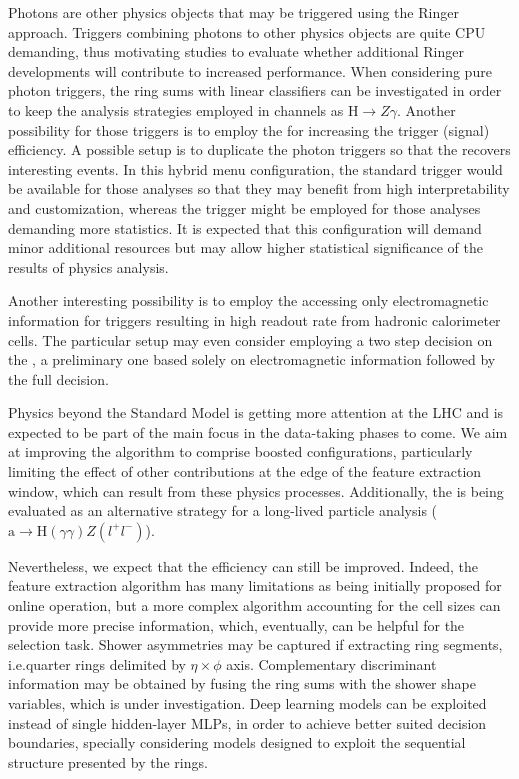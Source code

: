 Photons are other physics objects that may be triggered using the Ringer approach. Triggers combining photons to other physics objects are quite CPU demanding, thus motivating studies to evaluate whether additional Ringer developments will contribute to increased performance.
When considering pure photon triggers, the ring sums with linear classifiers can be investigated in order to keep the analysis strategies employed in channels as $\text{H}\rightarrow Z\gamma$. Another possibility for those triggers is to
employ the \rnn{} for increasing the trigger (signal) efficiency. A possible
setup is to duplicate the photon triggers so that the \rnn{} recovers
interesting events.  In this hybrid menu configuration, the standard trigger
would be available for those analyses so that they may benefit from high
interpretability and customization, whereas the \rnn{} trigger might be employed
for those analyses demanding more statistics. It is expected that this
configuration will demand minor additional resources but may allow higher
statistical significance of the results of physics analysis.


Another interesting possibility is to employ the \rnn{} accessing only
electromagnetic information for triggers resulting in high readout rate from
hadronic calorimeter cells. The particular setup may even consider employing a
two step decision on the \fastcalo{}, a preliminary one based solely on
electromagnetic information followed by the full \rnn{} decision.




Physics beyond the Standard Model is getting more attention at the LHC and is expected to be part of the main focus in the data-taking phases to
come. We aim at improving the \rnn{} algorithm to comprise boosted
configurations, particularly limiting the effect of other contributions at
the edge of the feature extraction window, which can result from these physics
processes. Additionally, the \rnn{} is being evaluated as an alternative
strategy for a long-lived particle analysis ($\text{a}\rightarrow\text{H}(\gamma\gamma)Z(l^+l^-)$).


Nevertheless, we expect that the \rnn{} efficiency can still be improved. Indeed, the feature extraction
algorithm has many limitations as being initially proposed for online
operation, but a more complex algorithm accounting for the cell sizes can
provide more precise information, which, eventually, can be helpful for the
selection task. Shower asymmetries may be captured if extracting ring segments,
i.e.\@ quarter rings delimited by $\eta\times\phi$ axis. Complementary
discriminant information may be obtained by fusing the ring sums with the shower shape variables,
which is under investigation. Deep learning models can be exploited instead of
single hidden-layer MLPs, in order to achieve better suited decision boundaries,
specially considering models designed to exploit the sequential structure
presented by the rings.



